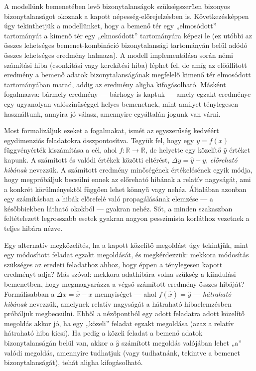\documentclass[
  magyar,
  11pt]{article}
\begin{document}
A modellünk bemenetében levő bizonytalanságok szükségszerűen bizonyos
bizonytalanságot okoznak a kapott népesség-előrejelzésben is.
Következésképpen úgy tekinthetjük a modellünket, hogy a bemenő tér egy
„elmosódott'' tartományát a kimenő tér egy „elmosódott'' tartományára
képezi le (ez utóbbi az összes lehetséges bemenet-kombináció
bizonytalansági tartományán belül adódó összes lehetséges eredmény
halmaza). A modell implementálása során némi számítási hiba (csonkítási
vagy kerekítési hiba) léphet fel, de amíg az előállított eredmény a
bemenő adatok bizonytalanságának megfelelő kimenő tér elmosódott
tartományában marad, addig az eredmény aligha kifogásolható. Másként
fogalmazva: bármely eredmény --- bárhogy is kaptuk --- amely egzakt
eredménye egy ugyanolyan valószínűséggel helyes bemenetnek, mint amilyet
ténylegesen használtunk, annyira jó válasz, amennyire egyáltalán jogunk
van várni.

Most formalizáljuk ezeket a fogalmakat, ismét az egyszerűség kedvéért
egydimenziós feladatokra összpontosítva. Tegyük fel, hogy egy
\(y = f(x)\) függvényérték kiszámítása a cél, ahol
\(f: \mathbb{R} \to \mathbb{R}\), de helyette egy közelítő \(\hat{y}\)
értéket kapunk. A számított és valódi értékek közötti eltérést,
\(\Delta y = \hat{y} - y\), \emph{előreható hibának} nevezzük. A
számított eredmény minőségének értékelésének egyik módja, hogy
megpróbáljuk becsülni ennek az előreható hibának a relatív nagyságát,
ami a konkrét körülményektől függően lehet könnyű vagy nehéz. Általában
azonban egy számításban a hibák előrefelé való propagálásának elemzése
--- a későbbiekben látható okokból --- gyakran nehéz. Sőt, a minden
szakaszban feltételezett legrosszabb esetek gyakran nagyon pesszimista
korláthoz vezetnek a teljes hibára nézve.

Egy alternatív megközelítés, ha a kapott közelítő megoldást úgy
tekintjük, mint egy módosított feladat egzakt megoldását, és
megkérdezzük: mekkora módosítás szükséges az eredeti feladathoz ahhoz,
hogy éppen a ténylegesen kapott eredményt adja? Más szóval: mekkora
adathibára volna szükség a kiindulási bemenetben, hogy megmagyarázza a
végső számított eredmény összes hibáját? Formálisabban a
\(\Delta x = \hat{x} - x\) mennyiséget --- ahol \(f(\hat{x}) = \hat{y}\)
--- \emph{hátraható hibának} nevezzük, amelynek relatív nagyságát a
hátraható hibaelemzésben próbáljuk megbecsülni. Ebből a nézőpontból egy
adott feladatra adott közelítő megoldás akkor jó, ha egy „közeli''
feladat egzakt megoldása (azaz a relatív hátraható hiba kicsi). Ha pedig
a közeli feladat a bemenő adatok bizonytalanságán belül van, akkor a
\(\hat{y}\) számított megoldás valójában lehet „a'' valódi megoldás,
amennyire tudhatjuk (vagy tudhatnánk, tekintve a bemenet
bizonytalanságát), tehát aligha kifogásolható.
\end{document}
